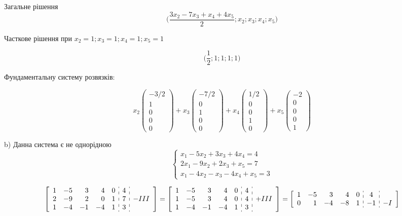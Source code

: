 Загальне рішення
$$
\Bigg(\dfrac{3x_2-7x_3+x_4+4x_5}{2};x_2;x_3;x_4;x_5 \Bigg)
$$

Часткове рішення при $x_2=1; x_3=1;x_4=1;x_5=1$

$$
\Bigg( \dfrac{1}{2}; 1; 1; 1; 1 \Bigg)
$$

Фундаментальну систему розвязків:

$$
 x_2 \begin{pmatrix}-3/2\\1\\0\\0\\0\end{pmatrix}
+x_3 \begin{pmatrix}-7/2\\0\\1\\0\\0\end{pmatrix}
+x_4 \begin{pmatrix}1/2\\0\\0\\1\\0\end{pmatrix}
+x_5 \begin{pmatrix}-2\\0\\0\\0\\1\end{pmatrix}
$$

b) Данна система є не однорідною
$$
\begin{cases}
    x_1-5x_2+3x_3+4x_4=4 \\
    2x_1-9x_2+2x_3+x_5=7 \\
    x_1-4x_2-x_3-4x_4+x_5=3
  \end{cases}
$$


$$
\left[ \begin{array}{rrrrr:c:c}
1 & -5 &  3 &  4 & 0 & 4 & \\
2 & -9 &  2 &  0 & 1 & 7 & -III \\
1 & -4 & -1 & -4 & 1 & 3 & \\
\end{array} \right] = \left[ \begin{array}{rrrrr:c:c}
1 & -5 &  3 &  4 & 0 & 4 & \\
1 & -5 &  3 &  4 & 0 & 4 & +III \\
1 & -4 & -1 & -4 & 1 & 3 & \\
\end{array} \right] = \left[ \begin{array}{rrrrr:c:c}
1 & -5 &  3 &  4 & 0 & 4 & \\
0 & 1  & -4 & -8 & 1 & -1 & - I \\
\end{array} \right]
$$

